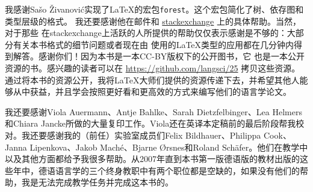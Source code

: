 我感谢Sašo Živanović实现了\LaTeX{}的宏包\texttt{forest}。这个宏包简化了树、依存图和类型层级的格式。
我还要感谢他在邮件和 \href{http://www.stackexchange.com}{stackexchange} 上的具体帮助。当然，对于那些
在stackexchange上活跃的人所提供的帮助仅仅表示感谢是不够的：大部分有关本书格式的细节问题或者现在由
\lsp 使用的\LaTeX{}类型的应用都在几分钟内得到解答。感谢你们！因为本书是一本CC-BY版权下的公开图书，它
也是一本公开资源的书。感兴趣的读者可以在 \url{https://github.com/langsci/25} 拷贝这些资源。通过将本书的资源公开，我将\LaTeX{}大师们提供的资源传递下去，并希望其他人能够从中获益，并且学会按照更好看和更高效的方式来编写他们的语言学论文。

我还要感谢Viola Auermann、Antje Bahlke、Sarah Dietzfelbinger、Lea Helmers和Chiara Jancke所做的大量复印工作。Viola还在英译本定稿前的最后阶段帮我校对。我还要感谢我的（前任）实验室成员们Felix Bildhauer、Philippa Cook、Janna Lipenkova、Jakob Maché、Bjarne Ørsnes和Roland Schäfer。他们在教学中以及其他方面都给予我很多帮助。从2007年直到本书第一版德语版的教材出版的这些年中，德语语言学的三个终身教职中有两个职位都是空缺的，如果没有他们的帮助，我是无法完成教学任务并完成这本书的。


